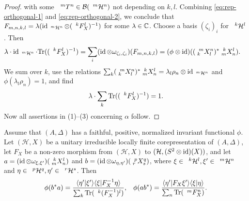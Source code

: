 \begin{proof}
  with some $\Gru{T}{m}{n} \in \mathcal{B}(\Gru{\mathcal{H}}{m}{n})$
  not depending on $k,l$. Combining \eqref{eq:rep-orthogonal-1} and
  \eqref{eq:rep-orthogonal-2}, we conclude that $F_{m,n,k,l} = \lambda
  (\id_{\Gru{\mathcal{H}}{m}{n}} \otimes (\Gru{F_{X}}{k}{l})^{-1})$
  for some $\lambda \in \C$.  Choose a basis
  $(\zeta_{i})_{i}$ for $\Gru{\mathcal{H}}{k}{l}$. Then
  \begin{align*}
    \lambda \cdot \id_{\Gru{\mathcal{H}}{m}{n}} \cdot
    \Tr((\Gru{F_{X}}{k}{l})^{-1}) &= \sum_{i} (\id \otimes
    \omega_{\zeta_{i},\zeta_{i}})(F_{m,n,k,l}) = (\phi \otimes
    \id)((\Gr{X}{m}{n}{k}{l})^{*} \Gr{X}{k}{l}{m}{n}).
  \end{align*}
  We sum over $k$, use the relations $\sum_{k}
  (\Gr{X}{m}{n}{k}{l})^{*} \Gr{X}{k}{l}{m}{n} = \lambda_{l}\rho_{n}
  \otimes \id_{\Gru{\mathcal{H}}{m}{n}}$ and
  $\phi(\lambda_{l}\rho_{n})=1$, and find
\begin{align*}
\lambda \cdot  \sum_{k} \Tr((\Gru{F_{X}}{k}{l})^{-1}) = 1.
\end{align*}
Now all assertions in (1)--(3) concerning $\alpha$ follow.
\end{proof}
\begin{Cor}
  Assume that $(A,\Delta)$ has a faithful, positive, normalized
  invariant functional $\phi$. Let $(\mathcal{H},X)$ be a unitary
  irreducible locally finite corepresentation of $(A,\Delta)$, let
  $F_{X}$ be a non-zero morphism from $(\mathcal{H},X)$ to
  $(\mathcal{H},(S^{2} \otimes \id)(X))$, and let $a=(\id \otimes
  \omega_{\xi,\xi'})(\Gr{X}{k}{l}{m}{n})$ and $b=(\id \otimes
  \omega_{\eta,\eta'})(\Gr{X}{p}{q}{r}{s})$, where $\xi \in
  \Gru{\mathcal{H}}{k}{l}, \xi' \in \Gru{\mathcal{H}}{m}{n}$ and $\eta
  \in \Gru{\mathcal{H}}{p}{q}, \eta' \in \Gru{\mathcal{H}}{r}{s}$.
  Then
\begin{align*}
  \phi(b^{*}a) &= \frac{\langle \eta'|\xi'\rangle \langle
    \xi|F^{-1}_{X}\eta\rangle}{\sum_{k}
    \Tr(\Gru{(F^{-1}_{X})}{k}{l})}, & \phi(ab^{*}) = \frac{\langle
    \eta'|F_{X}\xi'\rangle \langle \xi|\eta\rangle}{\sum_{n}
    \Tr(\Gru{F_{X}}{m}{n})}.
\end{align*}
\end{Cor}
